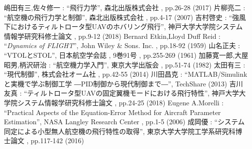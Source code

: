 
\begin{thebibliography}{99}


嶋田有三,佐々修一 : ``飛行力学'', 森北出版株式会社 , pp.26-28 (2017)
片柳亮二 : ``航空機の飛行力学と制御'', 森北出版株式会社 , pp.4-17 (2007)
吉村啓史 : ``強風下におけるティルトロータ型UAVのホバリング飛行'', 神戸大学大学院システム情報学研究科修士論文 , pp.9-12 (2018)
Bernard Etkin,Lloyd Duff Reid : ``\textit{Dynamics of FLIGHT}'', John Wiley & Sons. Inc. , pp.18-92 (1959)
山名正夫 : ``VTOLとSTOL'', 日本航空学会誌 , 9巻91号 , pp.255-269 (1961)
加藤寛一郎,大屋昭男,柄沢研治 : ``航空機力学入門'', 東京大学出版会 , pp.51-74  (1982)
太田有三 : ``現代制御'', 株式会社オーム社 , pp.42-55 (2014)
川田昌克 : ``MATLAB/Simulinkと実機で学ぶ制御工学 ―PID制御から現代制御まで―'', TechShare (2013)
吉川友真 : ``ティルトロータ型UAVの固定翼機モードにおける飛行特性'', 神戸大学大学院システム情報学研究科修士論文 , pp.24-25 (2018)
Eugene A.Morelli : ``Practical Aspects of the Equation-Error Method for Aircraft Parameter Estimation'', NASA Langley Research Center , pp.1-5 (2006)
成岡優 : ``システム同定による小型無人航空機の飛行特性の取得'', 東京大学大学院工学系研究科博士論文 , pp.117-142 (2016)

\end{thebibliography}

\newpage
